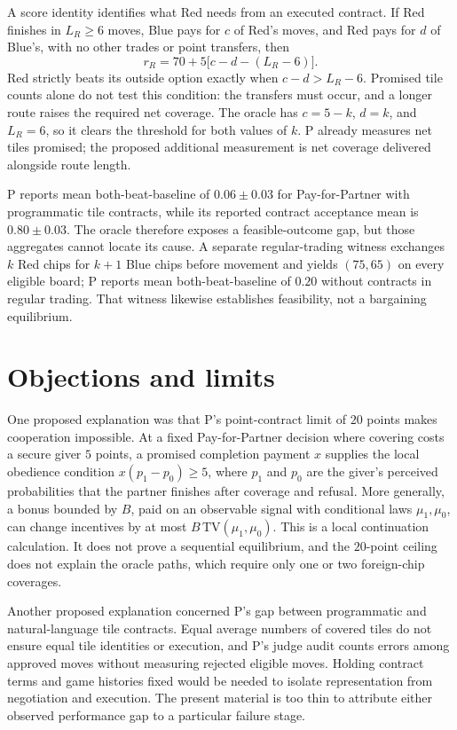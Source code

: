 \documentclass{article}
\begin{document}
A score identity identifies what Red needs from an executed contract. If Red finishes in \(L_R\geq6\) moves, Blue pays for \(c\) of Red's moves, and Red pays for \(d\) of Blue's, with no other trades or point transfers, then
\[
r_R=70+5\bigl[c-d-(L_R-6)\bigr].
\]
Red strictly beats its outside option exactly when \(c-d>L_R-6\). Promised tile counts alone do not test this condition: the transfers must occur, and a longer route raises the required net coverage. The oracle has \(c=5-k\), \(d=k\), and \(L_R=6\), so it clears the threshold for both values of \(k\). P already measures net tiles promised; the proposed additional measurement is net coverage delivered alongside route length. 

P reports mean both-beat-baseline of \(0.06\pm0.03\) for Pay-for-Partner with programmatic tile contracts, while its reported contract acceptance mean is \(0.80\pm0.03\). The oracle therefore exposes a feasible-outcome gap, but those aggregates cannot locate its cause. A separate regular-trading witness exchanges \(k\) Red chips for \(k+1\) Blue chips before movement and yields \((75,65)\) on every eligible board; P reports mean both-beat-baseline of \(0.20\) without contracts in regular trading. That witness likewise establishes feasibility, not a bargaining equilibrium. 

\section*{Objections and limits}

One proposed explanation was that P's point-contract limit of \(20\) points makes cooperation impossible. At a fixed Pay-for-Partner decision where covering costs a secure giver \(5\) points, a promised completion payment \(x\) supplies the local obedience condition \(x(p_1-p_0)\geq5\), where \(p_1\) and \(p_0\) are the giver's perceived probabilities that the partner finishes after coverage and refusal. More generally, a bonus bounded by \(B\), paid on an observable signal with conditional laws \(\mu_1,\mu_0\), can change incentives by at most \(B\,\mathrm{TV}(\mu_1,\mu_0)\). This is a local continuation calculation. It does not prove a sequential equilibrium, and the \(20\)-point ceiling does not explain the oracle paths, which require only one or two foreign-chip coverages. 

Another proposed explanation concerned P's gap between programmatic and natural-language tile contracts. Equal average numbers of covered tiles do not ensure equal tile identities or execution, and P's judge audit counts errors among approved moves without measuring rejected eligible moves. Holding contract terms and game histories fixed would be needed to isolate representation from negotiation and execution. The present material is too thin to attribute either observed performance gap to a particular failure stage. 
\end{document}
